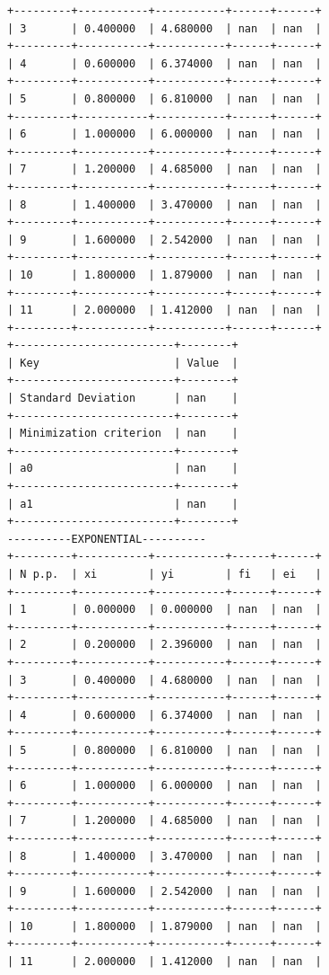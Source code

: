 \documentclass[12pt,one column]{article}
\begin{document}
\begin{verbatim}
+---------+-----------+-----------+------+------+
| 3       | 0.400000  | 4.680000  | nan  | nan  | 
+---------+-----------+-----------+------+------+
| 4       | 0.600000  | 6.374000  | nan  | nan  | 
+---------+-----------+-----------+------+------+
| 5       | 0.800000  | 6.810000  | nan  | nan  | 
+---------+-----------+-----------+------+------+
| 6       | 1.000000  | 6.000000  | nan  | nan  | 
+---------+-----------+-----------+------+------+
| 7       | 1.200000  | 4.685000  | nan  | nan  | 
+---------+-----------+-----------+------+------+
| 8       | 1.400000  | 3.470000  | nan  | nan  | 
+---------+-----------+-----------+------+------+
| 9       | 1.600000  | 2.542000  | nan  | nan  | 
+---------+-----------+-----------+------+------+
| 10      | 1.800000  | 1.879000  | nan  | nan  | 
+---------+-----------+-----------+------+------+
| 11      | 2.000000  | 1.412000  | nan  | nan  | 
+---------+-----------+-----------+------+------+
+-------------------------+--------+
| Key                     | Value  | 
+-------------------------+--------+
| Standard Deviation      | nan    | 
+-------------------------+--------+
| Minimization criterion  | nan    | 
+-------------------------+--------+
| a0                      | nan    | 
+-------------------------+--------+
| a1                      | nan    | 
+-------------------------+--------+
----------EXPONENTIAL----------
+---------+-----------+-----------+------+------+
| N p.p.  | xi        | yi        | fi   | ei   | 
+---------+-----------+-----------+------+------+
| 1       | 0.000000  | 0.000000  | nan  | nan  | 
+---------+-----------+-----------+------+------+
| 2       | 0.200000  | 2.396000  | nan  | nan  | 
+---------+-----------+-----------+------+------+
| 3       | 0.400000  | 4.680000  | nan  | nan  | 
+---------+-----------+-----------+------+------+
| 4       | 0.600000  | 6.374000  | nan  | nan  | 
+---------+-----------+-----------+------+------+
| 5       | 0.800000  | 6.810000  | nan  | nan  | 
+---------+-----------+-----------+------+------+
| 6       | 1.000000  | 6.000000  | nan  | nan  | 
+---------+-----------+-----------+------+------+
| 7       | 1.200000  | 4.685000  | nan  | nan  | 
+---------+-----------+-----------+------+------+
| 8       | 1.400000  | 3.470000  | nan  | nan  | 
+---------+-----------+-----------+------+------+
| 9       | 1.600000  | 2.542000  | nan  | nan  | 
+---------+-----------+-----------+------+------+
| 10      | 1.800000  | 1.879000  | nan  | nan  | 
+---------+-----------+-----------+------+------+
| 11      | 2.000000  | 1.412000  | nan  | nan  | 

\end{verbatim}
\end{document}
